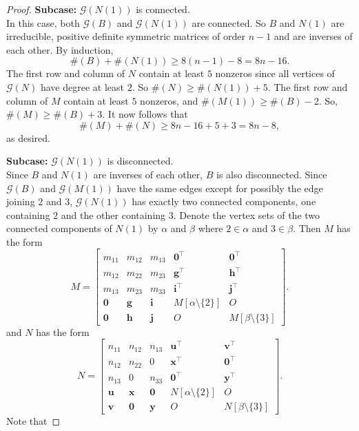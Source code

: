 \documentclass[12pt]{article}
\theoremstyle{definition}
\theoremstyle{definition}
\theoremstyle{definition}
\numberwithin{figure}{section}
\numberwithin{equation}{section}
\newcommand{\G}{\mathcal{G}}
\begin{document}
\begin{proof}
\bigskip\noindent
{\bf Subcase:} $\G(N(1))$ is connected.
\\
In this case, both  $\G(B)$  and $\G(N(1))$ are connected. So $B$ and $N(1)$ 
are irreducible, positive definite symmetric matrices of order $n-1$ 
and are inverses of each other. By induction, 
\[ \#(B) + \#(N(1))\geq 8(n-1)-8=8n-16.\]
The first row and column of $N$ contain at least $5$ nonzeros since all vertices of $\G(N)$ have degree at least $2$.
So $\#(N)\geq \#(N(1))+5$.  The first row and column of $M$ contain 
at least $5$ nonzeros, and $\#(M(1))\geq \#(B)-2$.  So, 
$\#(M) \geq \#(B)+3$.  It now follows that 
\[ \#(M) +\#(N) \geq 8n-16 + 5 + 3=8n-8,\] as desired. 

\bigskip\noindent
{\bf Subcase:} $\G(N(1))$ is disconnected.
\\
Since $B$ and $N(1)$ are inverses of each other, $B$ is also disconnected.  
Since $\G(B)$ and $\G(M(1))$ have the same edges except for possibly the edge joining $2$ and $3$, $\mathcal{G}(N(1))$ has exactly two 
connected components, one containing $2$ and 
the other containing $3$. Denote the vertex sets of the two connected components of $N(1)$ by $ \alpha$ and $ \beta$ where $2 \in \alpha$
and $3 \in \beta$.
Then  $M$ has the form 
\[ 
M= 
\left[ \begin{array}{ccc|c|c}
m_{11} & m_{12} & m_{13} & \mathbf 0^{\top} & \mathbf{0}^{\top}\\
m_{12} & m_{22} & m_{23} & \mathbf g^{\top} & \mathbf h^{\top} \\
m_{13} & m_{23} & m_{33} & \mathbf i^{\top} & \mathbf j^{\top}  \\ \hline
\mathbf 0 & \mathbf g &\mathbf i &  M[\alpha\setminus\{2\} ] & O 
\\ \hline 
\mathbf 0 & \mathbf h & \mathbf j &  O & M[\beta\setminus \{3\}] 
\end{array} \right] .  
\] 
and $N$ has the form 
\[
N= 
\left[ 
\begin{array}{ccc|c|c} 
n_{11} & n_{12} & n_{13} & \mathbf u^{\top} & \mathbf v^{\top} \\
n_{12} & n_{22}  & 0 & \mathbf x^{\top} & \mathbf 0^{\top}\\
n_{13} & 0 & n_{33} &  \mathbf 0^{\top} & \mathbf y^{\top} \\ \hline 
\mathbf u & \mathbf x &  \mathbf 0 &  N[\alpha\setminus\{2\}] & O \\ \hline 
\mathbf v & \mathbf {0} & {\mathbf y} & O & N[\beta
\setminus\{3\} ]
\end{array} 
\right] .
\] 
Note that  

\end{proof}
\end{document}
